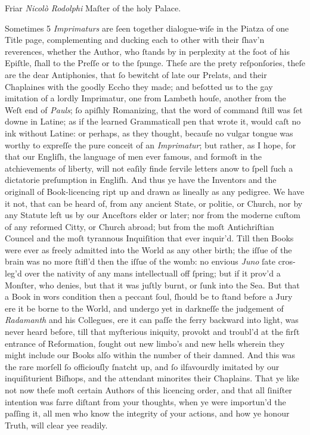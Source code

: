 \hfill Friar \textit{Nicolò Rodolphi} Maſter of the holy Palace.

\vspace{\baselineskip}

Sometimes 5 \textit{Imprimaturs} are ſeen together dialogue-wiſe in the Piatza
of one Title page, complementing and ducking each to other with their ſhav'n
reverences, whether the Author, who ſtands by in perplexity at the foot of his
Epiſtle, ſhall to the Preſſe or to the ſpunge.  Theſe are the prety
reſponſories, theſe are the dear Antiphonies, that ſo bewitcht of late our
Prelats, and their Chaplaines with the goodly Eccho they made; and beſotted us
to the gay imitation of a lordly Imprimatur, one from Lambeth houſe, another
from the Weſt end of \textit{Pauls}; ſo apiſhly Romanizing, that the word of
command ſtill was ſet downe in Latine; as if the learned Grammaticall pen that
wrote it, would caſt no ink without Latine: or perhaps, as they thought, becauſe
no vulgar tongue was worthy to expreſſe the pure conceit of an
\textit{Imprimatur}; but rather, as I hope, for that our Engliſh, the language
of men ever famous, and formoſt in the atchievements of liberty, will not eaſily
finde ſervile letters anow to ſpell ſuch a dictatorie preſumption in Engliſh.
And thus ye have the Inventors and the originall of Book-licencing ript up and
drawn as lineally as any pedigree.  We have it not, that can be heard of, from
any ancient State, or politie, or Church, nor by any Statute left us by our
Anceſtors elder or later; nor from the moderne cuſtom of any reformed Citty, or
Church abroad; but from the moſt Antichriſtian Councel and the moſt tyrannous
Inquiſition that ever inquir'd.  Till then Books were ever as freely admitted
into the World as any other birth; the iſſue of the brain was no more ſtifl'd
then the iſſue of the womb: no envious \textit{Juno} ſate cros-leg'd over the
nativity of any mans intellectuall off ſpring; but if it prov'd a Monſter, who
denies, but that it was juſtly burnt, or ſunk into the Sea.  But that a Book in
wors condition then a peccant ſoul, ſhould be to ſtand before a Jury ere it be
borne to the World, and undergo yet in darkneſſe the judgement of
\textit{Radamanth} and his Collegues, ere it can paſſe the ferry backward into
light, was never heard before, till that myſterious iniquity, provokt and
troubl'd at the firſt entrance of Reformation, ſought out new limbo's and new
hells wherein they might include our Books alſo within the number of their
damned.  And this was the rare morſell ſo officiouſly ſnatcht up, and ſo
ilfavourdly imitated by our inquiſiturient Biſhops, and the attendant minorites
their Chaplains.  That ye like not now theſe moſt certain Authors of this
licencing order, and that all ſiniſter intention was farre diſtant from your
thoughts, when ye were importun'd the paſſing it, all men who know the integrity
of your actions, and how ye honour Truth, will clear yee readily.

